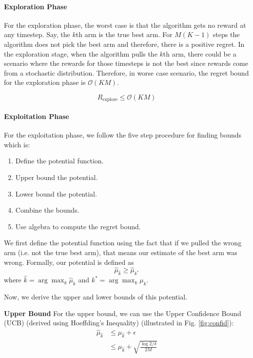 \documentclass[11pt]{article}
\begin{document}
\paragraph{Exploration Phase}
For the exploration phase, the worst case is that the algorithm gets no reward at any timestep. Say, the $k$th arm is the true best arm. For $M(K-1)$ steps the algorithm does not pick the best arm and therefore, there is a positive regret. In the exploration stage, when the algorithm pulls the $k$th arm, there could be a scenario where the rewards for those timesteps is not the best since rewards come from a stochastic distribution. Therefore, in worse case scenario, the regret bound for the exploration phase is $\mathcal{O}(KM)$.

$$ R_{\text{explore}} \leq \mathcal{O}(KM)$$

\paragraph{Exploitation Phase}
For the exploitation phase, we follow the five step procedure for finding bounds which is:
\begin{enumerate}
    \item Define the potential function.
    \item Upper bound the potential.
    \item Lower bound the potential.
    \item Combine the bounds.
    \item Use algebra to compute the regret bound.
\end{enumerate}

We first define the potential function using the fact
that if we pulled the wrong arm (i.e. not the true best arm), that means
our estimate of the best arm was wrong. Formally, our potential is defined
as
\[
\hat{\mu}_{\hat{k}} \geq \hat{\mu}_{k^*}
\] 
where $\widehat{k} = \arg\max_{k} \widehat{\mu}_k $ and $k^{\ast} = \arg\max_{k} \mu_k$. 

Now, we derive the upper and lower bounds of this potential.

\textbf{Upper Bound} For the upper bound, we can use the Upper Confidence Bound (UCB) (derived using Hoeffding's Inequality) (illustrated
in Fig. \ref{fig:confid}):
\begin{align*}
\hat{\mu}_{\hat{k}} &\leq \mu_{\hat{k}} + \epsilon\\
&\leq \mu_{\hat{k}} + \sqrt{\frac{\log{2/\delta}}{2M}}
\end{align*}
\end{document}
